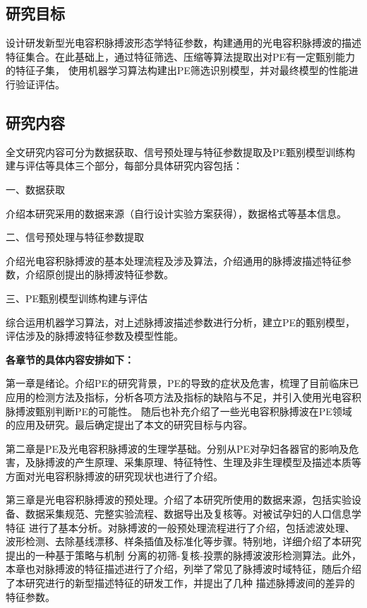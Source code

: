 \subsection{研究目标}
设计研发新型光电容积脉搏波形态学特征参数，构建通用的光电容积脉搏波的描述特征集合。在此基础上，通过特征筛选、压缩等算法提取出对PE有一定甄别能力的特征子集，
使用机器学习算法构建出PE筛选识别模型，并对最终模型的性能进行验证评估。
\subsection{研究内容}
全文研究内容可分为数据获取、信号预处理与特征参数提取及PE甄别模型训练构建与评估等具体三个部分，每部分具体研究内容包括：

一、数据获取

介绍本研究采用的数据来源（自行设计实验方案获得），数据格式等基本信息。

二、信号预处理与特征参数提取

介绍光电容积脉搏波的基本处理流程及涉及算法，介绍通用的脉搏波描述特征参数，介绍原创提出的脉搏波特征参数。

三、PE甄别模型训练构建与评估

综合运用机器学习算法，对上述脉搏波描述参数进行分析，建立PE的甄别模型，评估涉及的脉搏波特征参数及模型性能。

\textbf{各章节的具体内容安排如下：}

第一章是绪论。介绍PE的研究背景，PE的导致的症状及危害，梳理了目前临床已应用的检测方法及指标，分析各项方法及指标的缺陷与不足，并引入使用光电容积脉搏波甄别判断PE的可能性。
随后也补充介绍了一些光电容积脉搏波在PE领域的应用及研究。最后确定提出了本文的研究目标与内容。

第二章是PE及光电容积脉搏波的生理学基础。分别从PE对孕妇各器官的影响及危害，及脉搏波的产生原理、采集原理、特征特性、生理及非生理模型及描述本质等方面对光电容积脉搏波的研究现状也进行了介绍。

第三章是光电容积脉搏波的预处理。介绍了本研究所使用的数据来源，包括实验设备、数据采集规范、完整实验流程、数据导出及复核等。对被试孕妇的人口信息学特征
进行了基本分析。对脉搏波的一般预处理流程进行了介绍，包括滤波处理、波形检测、去除基线漂移、样条插值及标准化等步骤。特别地，详细介绍了本研究提出的一种基于策略与机制
分离的初筛-复核-投票的脉搏波波形检测算法。此外，本章也对脉搏波的特征描述进行了介绍，列举了常见了脉搏波时域特征，随后介绍了本研究进行的新型描述特征的研发工作，并提出了几种
描述脉搏波间的差异的特征参数。

